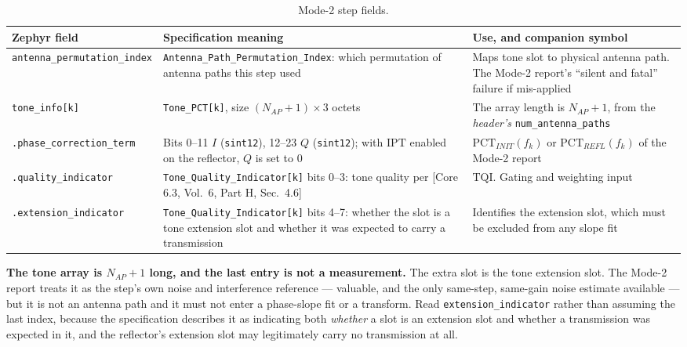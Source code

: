 \documentclass[11pt,a4paper]{article}
\newcommand{\code}[1]{\texttt{\small #1}}
\newcommand{\PCT}{\ensuremath{\mathrm{PCT}}}
\newcommand{\TQI}{\ensuremath{\mathrm{TQI}}}
\newcommand{\IPT}{\ensuremath{\mathrm{IPT}}}
\newcommand{\Nap}{\ensuremath{N_{AP}}}
\newcommand{\core}[1]{\textcolor{rulegrey}{\small[Core 6.3, #1]}}
\begin{document}
\begin{table}[htb]
\caption{Mode-2 step fields.}
\label{tab:mode2}
\centering\scriptsize
\begin{tabular}{@{}L{32mm}L{56mm}L{50mm}@{}}
\toprule
Zephyr field & Specification meaning & Use, and companion symbol \\
\midrule
\code{antenna\_\allowbreak{}permutation\_\allowbreak{}index} & \code{Antenna\_\allowbreak{}Path\_\allowbreak{}Permutation\_\allowbreak{}Index}: which permutation of antenna paths this step used & Maps tone slot to physical antenna path. The Mode-2 report's ``silent and fatal'' failure if mis-applied \\
\code{tone\_\allowbreak{}info[k]} & \code{Tone\_\allowbreak{}PCT[k]}, size $(\Nap+1)\times3$ octets & The array length is $\Nap+1$, from the \emph{header's} \code{num\_\allowbreak{}antenna\_\allowbreak{}paths} \\
\code{.phase\_\allowbreak{}correction\_\allowbreak{}term} & Bits 0--11 $I$ (\code{sint12}), 12--23 $Q$ (\code{sint12}); with \IPT{} enabled on the reflector, $Q$ is set to $0$ & $\PCT_{INIT}(f_k)$ or $\PCT_{REFL}(f_k)$ of the Mode-2 report \\
\code{.quality\_\allowbreak{}indicator} & \code{Tone\_\allowbreak{}Quality\_\allowbreak{}Indicator[k]} bits 0--3: tone quality per \core{Vol.\ 6, Part H, Sec.\ 4.6} & $\TQI$. Gating and weighting input \\
\code{.extension\_\allowbreak{}indicator} & \code{Tone\_\allowbreak{}Quality\_\allowbreak{}Indicator[k]} bits 4--7: whether the slot is a tone extension slot and whether it was expected to carry a transmission & Identifies the extension slot, which must be excluded from any slope fit \\
\bottomrule
\end{tabular}
\end{table}

\begin{caution}
\textbf{The tone array is $\Nap+1$ long, and the last entry is not a measurement.} The extra slot is
the tone extension slot. The Mode-2 report treats it as the step's own noise and interference
reference --- valuable, and the only same-step, same-gain noise estimate available --- but it is not
an antenna path and it must not enter a phase-slope fit or a transform. Read
\code{extension\_\allowbreak{}indicator} rather than assuming the last index, because the specification describes
it as indicating both \emph{whether} a slot is an extension slot and whether a transmission was
expected in it, and the reflector's extension slot may legitimately carry no transmission at all.
\end{caution}
\end{document}
